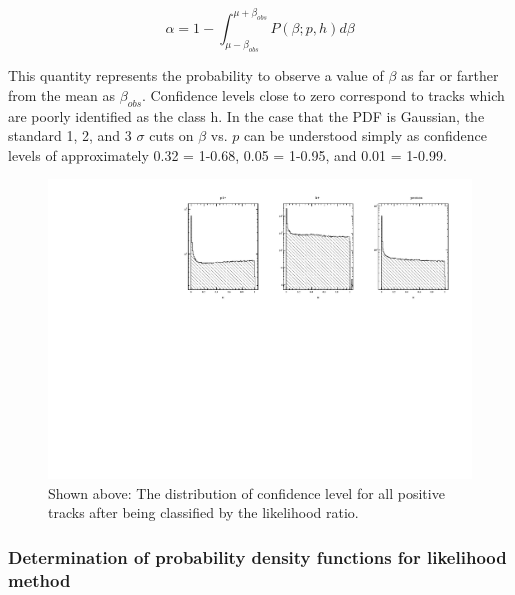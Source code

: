 \begin{equation}
  \alpha = 1 - \int_{\mu-\beta_{obs}}^{\mu+\beta_{obs}} P(\beta;p,h) d\beta
\end{equation}

This quantity represents the probability to observe a value of $\beta$ as far or farther from the mean as $\beta_{obs}$.  Confidence levels close to zero correspond to tracks which are poorly identified as the class h.  In the case that the PDF is Gaussian, the standard 1, 2, and 3 $\sigma$ cuts on $\beta$ vs. $p$ can be understood simply as confidence levels of approximately 0.32 = 1-0.68, 0.05 = 1-0.95, and 0.01 = 1-0.99.

\begin{figure}
  \begin{center}
    \includegraphics[width=14cm]{image/plots/hadron-id/confidence_level.pdf}
    \caption{ Shown above: The distribution of confidence level for all positive tracks after being classified by the likelihood ratio.}
  \end{center}
\end{figure}

\subsubsection*{Determination of probability density functions for likelihood method}

